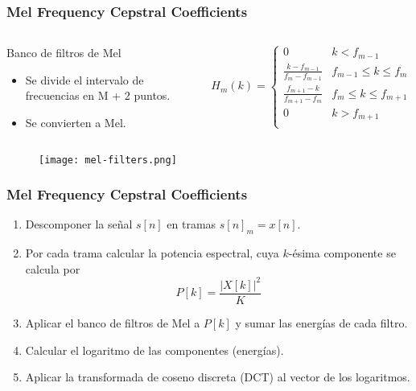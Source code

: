 \begin{frame}
    \frametitle{Mel Frequency Cepstral Coefficients}

    \begin{columns}
        \pause

        \begin{block}{Banco de filtros de Mel}
            \begin{itemize}
                \item Se divide el intervalo de frecuencias en M + 2 puntos.
                \item Se convierten a Mel.
            \end{itemize}
        \end{block}

        \pause

        {\small
        \begin{equation*}
            H_m(k) = \begin{cases}
                         0 & k < f_{m-1} \\
                         \frac{k-f_{m-1}}{f_m - f_{m-1}} & f_{m-1}\leq k\leq f_m \\
                         \frac{f_{m+1}-k}{f_{m+1}-f_m} & f_m \leq k\leq f_{m+1} \\
                         0 & k > f_{m+1} \\
            \end{cases}
        \end{equation*}
        }
    \end{columns}

    \pause

    \begin{figure}[!h]
        \centering
        \texttt{[image: mel-filters.png]}
    \end{figure}
\end{frame}

\begin{frame}
    \frametitle{Mel Frequency Cepstral Coefficients}

    \begin{enumerate}
        \item<1-> Descomponer la señal $s[n]$ en tramas $s[n]_m = x[n]$.
        \item<2-> Por cada trama calcular la potencia espectral, cuya $k$-ésima componente se calcula por
        \begin{equation*}
            P[k] = \frac{|X[k]|^2}{K}
        \end{equation*}
        \item<3-> Aplicar el banco de filtros de Mel a $P[k]$ y sumar las energías de cada filtro.
        \item<4-> Calcular el logaritmo de las componentes (energías).
        \item<5-> Aplicar la transformada de coseno discreta (DCT) al vector de los logaritmos.
    \end{enumerate}
\end{frame}

